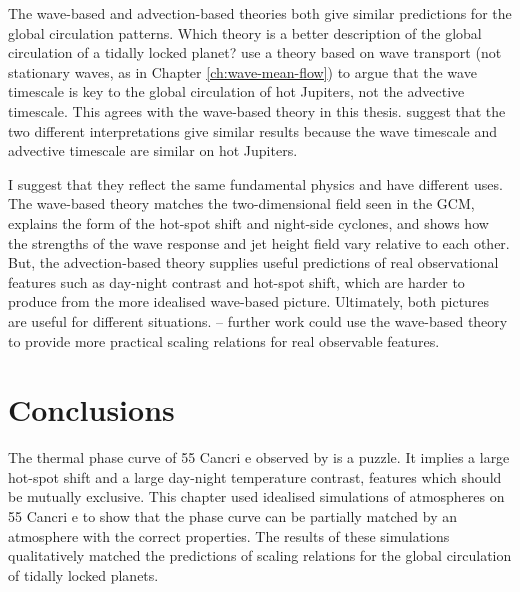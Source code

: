 The wave-based and advection-based theories both give similar predictions for the global circulation patterns. Which theory is a better description of the global circulation of a tidally locked planet? \citet{perez2013atmospheric} use a theory based on wave transport (not stationary waves, as in Chapter \ref{ch:wave-mean-flow}) to argue that the wave timescale is key to the global circulation of hot Jupiters, not the advective timescale. This agrees with the wave-based theory in this thesis. \citet{perez2013atmospheric} suggest that the two different interpretations give similar results because the wave timescale and advective timescale are similar on hot Jupiters.

 I suggest that they reflect the same fundamental physics and have different uses. The wave-based theory matches the two-dimensional field seen in the GCM, explains the form of the hot-spot shift and night-side cyclones, and shows how the strengths of the wave response and jet height field vary relative to each other. But, the advection-based theory supplies useful predictions of real observational features such as day-night contrast and hot-spot shift, which are harder to produce from the more idealised wave-based picture. Ultimately, both pictures are useful for different situations. -- further work could use the wave-based theory to provide more practical scaling relations for real observable features.



%
%
%





\section{Conclusions}

The thermal phase curve of 55 Cancri e observed by \citet{demory201655cnce} is a puzzle. It implies a large hot-spot shift and a large day-night temperature contrast, features which should be mutually exclusive. This chapter used idealised simulations of atmospheres on 55 Cancri e to show that the phase curve can be partially matched by an atmosphere with the correct properties. The results of these simulations qualitatively matched the predictions of scaling relations for the global circulation of tidally locked planets.


